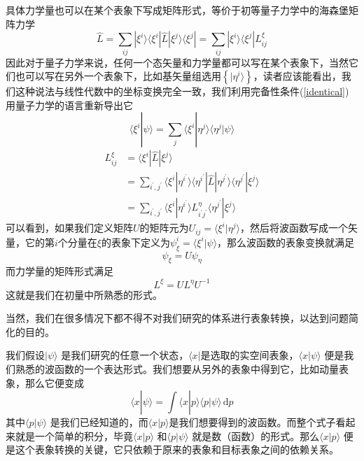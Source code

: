 \documentclass[12pt,a4paper,openany,twoside]{book}
\numberwithin{equation}{section}
\newcommand{\ud}{\mathrm{d}}
\begin{document}
        具体力学量也可以在某个表象下写成矩阵形式，等价于初等量子力学中的海森堡矩阵力学
        \begin{equation}
          \hat{L}=\sum_{i j} | \xi^{i} \rangle\langle\xi^{i}|\hat{L}| \xi^{j}\rangle\langle\xi^{j}|=\sum_{i j}| \xi^{i}\rangle\langle\xi^{j} | L_{i j}^{\xi}
          \label{matrix picture of operator}
        \end{equation}
        因此对于量子力学来说，任何一个态矢量和力学量都可以写在某个表象下，当然它们也可以写在另外一个表象下，比如基矢量组选用$\left\{|\eta^i\rangle\right\}$，读者应该能看出，我们这种说法与线性代数中的坐标变换完全一致，我们利用完备性条件(\ref{identical})用量子力学的语言重新导出它
        \begin{equation}
          \langle\xi^{i} | \psi\rangle=\sum_{j}\langle\xi^{i} | \eta^{j}\rangle\langle\eta^{j} | \psi\rangle
        \end{equation}
        \begin{equation}
          \begin{aligned}
            L_{i j}^{\xi} &=\langle\xi^{i}|\hat{L}| \xi^{j}\rangle \\
            &=\sum_{i^{\prime}, j^{\prime}}\langle\xi^{i} | \eta^{i^{\prime}}\rangle\langle\eta^{i^{\prime}}|\hat{L}| \eta^{j^{\prime}}\rangle\langle\eta^{j^{\prime}} | \xi^{j}\rangle \\
            &=\sum_{i^{\prime}, j^{\prime}}\langle\xi^{i} | \eta^{i^{\prime}}\rangle L_{i^{\prime} j^{\prime}}^{\eta}\langle\eta^{j^{\prime}} | \xi^{j}\rangle
          \end{aligned}
        \end{equation}
        可以看到，如果我们定义矩阵$U$的矩阵元为$U_{ij}=\langle\xi^{i} | \eta^{j}\rangle$，然后将波函数写成一个矢量，它的第$i$个分量在$\xi$的表象下定义为$\psi_{\xi}^i=\langle\xi^{i} | \psi\rangle$，那么波函数的表象变换就满足
        \begin{equation}
          \psi_{\xi}=U \psi_{\eta}
        \end{equation}
        而力学量的矩阵形式满足
        \begin{equation}
          L^{\xi}=U L^{\eta} U^{-1}
        \end{equation}
        这就是我们在初量中所熟悉的形式。



        当然，我们在很多情况下都不得不对我们研究的体系进行表象转换，以达到问题简化的目的。

        我们假设$| \psi \rangle $ 是我们研究的任意一个状态，$\langle x |  $是选取的实空间表象，$\langle x | \psi \rangle $ 便是我们熟悉的波函数的一个表达形式。我们想要从另外的表象中得到它，比如动量表象，那么它便变成
        \begin{equation*}
          \langle x | \psi \rangle = \int \langle x | p \rangle \langle p | \psi \rangle  \, \ud p 
        \end{equation*} 
        其中$\langle p | \psi \rangle $ 是我们已经知道的，而$\langle x | p \rangle $是我们想要得到的波函数。而整个式子看起来就是一个简单的积分，毕竟$\langle x | p \rangle $ 和$\langle p | \psi \rangle $ 就是数（函数）的形式。那么$\langle x | p \rangle $ 便是这个表象转换的关键，它只依赖于原来的表象和目标表象之间的依赖关系。
\end{document}
